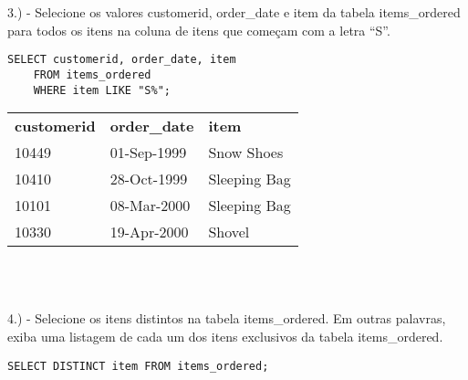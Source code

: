 3.) - Selecione os valores customerid, order\_date e item da tabela items\_ordered para todos os itens na coluna de itens que começam com a letra “S”.

\begin{lstlisting}
SELECT customerid, order_date, item
	FROM items_ordered
	WHERE item LIKE "S%";
\end{lstlisting}

\begin{tabular}{lll}
    {\textbf{customerid}} & {\textbf{order\_date}} & {\textbf{item}} \\
    10449                                      & 01-Sep-1999                                 & Snow Shoes                           \\
    10410                                      & 28-Oct-1999                                 & Sleeping Bag                         \\
    10101                                      & 08-Mar-2000                                 & Sleeping Bag                         \\
    10330                                      & 19-Apr-2000                                 & Shovel                              
\end{tabular} \\ \\ 

\newpage

4.) - Selecione os itens distintos na tabela items\_ordered. Em outras palavras, exiba uma listagem de cada um dos itens exclusivos da tabela items\_ordered.

\begin{lstlisting}
SELECT DISTINCT item FROM items_ordered;
\end{lstlisting}

